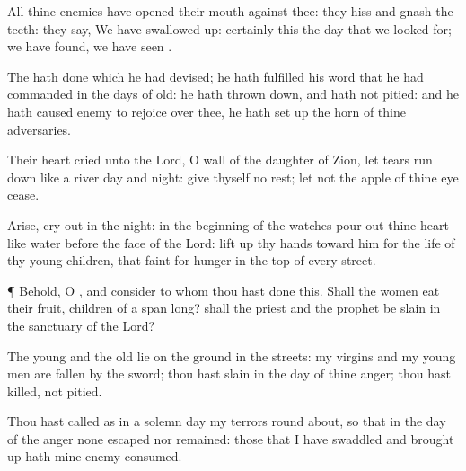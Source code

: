 {All thine
enemies have
opened their
mouth against thee: they
hiss and
gnash the
teeth: they
say, We have swallowed
{}
up:
certainly this
{} the
day that we looked
for; we have
found, we have
seen
{}.

The
{} hath
done
{} which he had
devised; he hath
fulfilled his
word that he had
commanded in the
days of
old: he hath thrown
down, and hath not
pitied: and he hath caused
{}
enemy to
rejoice over thee, he hath set
up the
horn of thine
adversaries.

Their
heart
cried unto the
Lord, O
wall of the
daughter of
Zion, let
tears run
down like a
river
day and
night:
give thyself no
rest; let not the
apple of thine
eye
cease.

Arise, cry
out in the
night: in the
beginning of the
watches pour
out thine
heart like
water
before the
face of the
Lord: lift
up thy
hands toward him for the
life of thy young
children, that
faint for
hunger in the
top of every
street.


\par }{\PP {}¶
Behold, O
{}, and
consider to whom thou hast
done
this. Shall the
women
eat their
fruit,
{}
children of a span
long? shall the
priest and the
prophet be
slain in the
sanctuary of the
Lord?

The
young and the
old
lie on the
ground in the
streets: my
virgins and my young
men are
fallen by the
sword; thou hast
slain
{} in the
day of thine
anger; thou hast
killed,
{} not
pitied.

Thou hast
called as in a
solemn
day my
terrors round
about, so that in the
day of the
{}
anger none
escaped nor
remained: those that I have
swaddled and brought
up hath mine
enemy
consumed.




\par }
